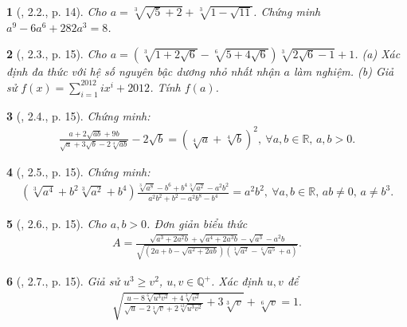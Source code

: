 \documentclass{article}
\newtheorem{baitoan}{}%
\begin{document}
\begin{baitoan}[\cite{TLCT_THCS_Toan_9_dai_so}, 2.2., p. 14]
	Cho $a = \sqrt[3]{\sqrt{5} + 2} + \sqrt[3]{1 - \sqrt{11}}$. Chứng minh $a^9 - 6a^6 + 282a^3 = 8$.
\end{baitoan}

\begin{baitoan}[\cite{TLCT_THCS_Toan_9_dai_so}, 2.3., p. 15]
	Cho $a = (\sqrt[3]{1 + 2\sqrt{6}} - \sqrt[6]{5 + 4\sqrt{6}})\sqrt[3]{2\sqrt{6} - 1} + 1$. (a) Xác định đa thức với hệ số nguyên bậc dương nhỏ nhất nhận $a$ làm nghiệm. (b) Giả sử $f(x) = \sum_{i=1}^{2012} ix^i + 2012$. Tính $f(a)$.
\end{baitoan}

\begin{baitoan}[\cite{TLCT_THCS_Toan_9_dai_so}, 2.4., p. 15]
	Chứng minh:
	\begin{align*}
		\frac{a + 2\sqrt{ab} + 9b}{\sqrt{a} + 3\sqrt{b} - 2\sqrt[4]{ab}} - 2\sqrt{b} = \left(\sqrt[4]{a} + \sqrt[4]{b}\right)^2,\ \forall a,b\in\mathbb{R},\,a,b > 0.
	\end{align*}
\end{baitoan}

\begin{baitoan}[\cite{TLCT_THCS_Toan_9_dai_so}, 2.5., p. 15]
	Chứng minh:
	\begin{align*}
		\left(\sqrt[3]{a^4} + b^2\sqrt[3]{a^2} + b^4\right)\frac{\sqrt[3]{a^8} - b^6 + b^4\sqrt[3]{a^2} - a^2b^2}{a^2b^2 + b^2 - a^2b^8 - b^4} = a^2b^2,\ \forall a,b\in\mathbb{R},\,ab\ne0,\,a\ne b^3.
	\end{align*}
\end{baitoan}

\begin{baitoan}[\cite{TLCT_THCS_Toan_9_dai_so}, 2.6., p. 15]
	Cho $a,b > 0$. Đơn giản biểu thức
	\begin{align*}
		A = \frac{\sqrt{a^3 + 2a^2b} + \sqrt{a^4 + 2a^3b} - \sqrt{a^3} - a^2b}{\sqrt{\left(2a + b - \sqrt{a^2 + 2ab}\right)\left(\sqrt[3]{a^2} - \sqrt[6]{a^5} + a\right)}}.
	\end{align*}
\end{baitoan}

\begin{baitoan}[\cite{TLCT_THCS_Toan_9_dai_so}, 2.7., p. 15]
	Giả sử $u^3\ge v^2$, $u,v\in\mathbb{Q}^+$. Xác định $u,v$ để
	\begin{align*}
		\sqrt{\frac{u - 8\sqrt[6]{u^3v^2} + 4\sqrt[3]{v^2}}{\sqrt{u} - 2\sqrt[3]{v} + 2\sqrt[12]{u^3v^2}} + 3\sqrt[3]{v}} + \sqrt[6]{v} = 1.
	\end{align*}
\end{baitoan}
\end{document}
